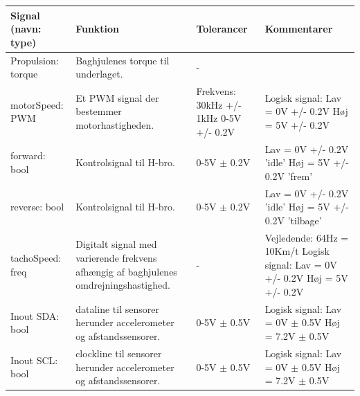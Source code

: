 \begin{table}[h]
	\centering
	\begin{tabularx}{\textwidth}{|l|X|X|X|} \hline
	\textbf{Signal (navn: type)} & \textbf{Funktion} & \textbf{Tolerancer} & \textbf{Kommentarer} \\ \hline

Propulsion: torque
	& Baghjulenes torque til underlaget.
	& - 
	& ~
	\\ \hline

motorSpeed: PWM
	& Et PWM signal der bestemmer motorhastigheden. 
	& Frekvens: 30kHz +/- 1kHz 0-5V +/- 0.2V
 	& Logisk signal: \newline
		Lav = 0V +/- 0.2V \newline
		Høj = 5V +/- 0.2V
	\\ \hline

forward: bool
	& Kontrolsignal til H-bro.
	& 0-5V $\pm$ 0.2V
	& Lav = 0V +/- 0.2V  ’idle’ \newline
		Høj =  5V +/- 0.2V  ’frem’
	\\ \hline
	
reverse: bool
	& Kontrolsignal til H-bro.
	& 0-5V $\pm$ 0.2V
	& Lav = 0V +/- 0.2V ’idle’ \newline
		Høj =  5V +/- 0.2V  ’tilbage’
	\\ \hline
	
tachoSpeed: freq
	& Digitalt signal med varierende frekvens afhængig af baghjulenes 					omdrejningshastighed.
	& - 
	& Vejledende: \newline
		64Hz = 10Km/t \newline
		Logisk signal: \newline
		Lav = 0V +/- 0.2V \newline
		Høj = 5V +/- 0.2V

	\\ \hline
	
Inout SDA: bool
	& \IIC dataline til sensorer herunder accelerometer og afstandssensorer. 
	& 0-5V $\pm$ 0.5V
 	& Logisk signal: \newline
		Lav = 0V $\pm$ 0.5V \newline
		Høj = 7.2V $\pm$ 0.5V
	\\ \hline

Inout SCL: bool
	& \IIC clockline  til sensorer herunder accelerometer og afstandssensorer. 
	& 0-5V $\pm$ 0.5V
 	& Logisk signal: \newline
		Lav = 0V $\pm$ 0.5V \newline
		Høj = 7.2V $\pm$ 0.5V
	\\ \hline


\end{tabularx}
\end{table}
